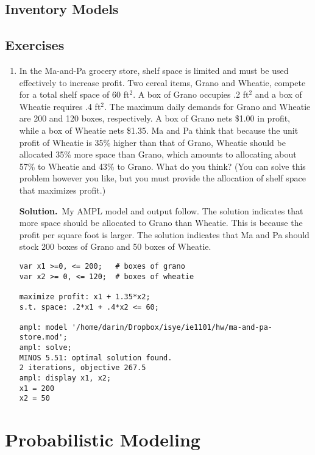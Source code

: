 \documentclass[12pt]{book}
\newcommand{\bs}{\textbf{Solution.}~}
\begin{document}
\section{Inventory Models}

\section{Exercises}
\begin{enumerate}

\item In the Ma-and-Pa grocery store, shelf space is limited
  and must be used effectively to increase profit. Two cereal items,
  Grano and Wheatie, compete for a total shelf space of 60 ft$^2$. A
  box of Grano occupies .2 ft$^2$ and a box of Wheatie requires .4
  ft$^2$. The maximum daily demands for Grano and Wheatie are 200 and 120
  boxes, respectively. A box of Grano nets \$1.00 in profit, while a
  box of Wheatie nets \$1.35. Ma and Pa think that because the unit
  profit of Wheatie is 35\% higher than that of Grano, Wheatie should
  be allocated 35\% more space than Grano, which amounts to allocating
  about 57\% to Wheatie and 43\% to Grano. What do you think?
  (You can solve this problem however you like, but you must provide
  the allocation of shelf space that maximizes profit.)

\begin{solution}
\bs My AMPL model and output follow. The solution indicates that more
space should be allocated to Grano than Wheatie. This is because
the profit per square foot is larger. The solution indicates that
Ma and Pa should stock 200 boxes of Grano and 50 boxes of Wheatie.

\begin{Verbatim}[samepage=true]
var x1 >=0, <= 200;   # boxes of grano
var x2 >= 0, <= 120;  # boxes of wheatie

maximize profit: x1 + 1.35*x2;
s.t. space: .2*x1 + .4*x2 <= 60;

ampl: model '/home/darin/Dropbox/isye/ie1101/hw/ma-and-pa-store.mod';
ampl: solve;
MINOS 5.51: optimal solution found.
2 iterations, objective 267.5
ampl: display x1, x2;
x1 = 200
x2 = 50
\end{Verbatim}
\end{solution}
\end{enumerate}

%  
\chapter{Probabilistic Modeling}
\end{document}
